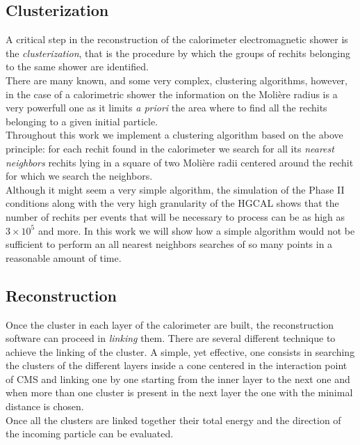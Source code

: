 \subsection{Clusterization}
A critical step in the reconstruction of the calorimeter electromagnetic shower is the \textit{clusterization}, that is the procedure by which the groups of rechits belonging to the same shower are identified.\\
There are many known, and some very complex, clustering algorithms, however, in the case of a calorimetric shower the information on the Molière radius is a very powerfull one as it limits \textit{a priori} the area where to find all the rechits belonging to a given initial particle.\\
Throughout this work we implement a clustering algorithm based on the above principle: for each rechit found in the calorimeter we search for all its \textit{nearest neighbors} rechits lying in a square of two Molière radii centered around the rechit for which we search the neighbors.\\
Although it might seem a very simple algorithm, the simulation of the Phase II conditions along with the very high granularity of the HGCAL shows that the number of rechits per events that will be necessary to process can be as high as $3 \times 10^5$ and more. In this work we will show how a simple algorithm would not be sufficient to perform an all nearest neighbors searches of so many points in a reasonable amount of time.

\subsection{Reconstruction}
Once the cluster in each layer of the calorimeter are built, the reconstruction software can proceed in \textit{linking} them. There are several different technique to achieve the linking of the cluster. A simple, yet effective, one consists in searching the clusters of the different layers inside a cone centered in the interaction point of CMS and linking one by one starting from the inner layer to the next one and when more than one cluster is present in the next layer the one with the minimal distance is chosen.\\
Once all the clusters are linked together their total energy and the direction of the incoming particle can be evaluated.

